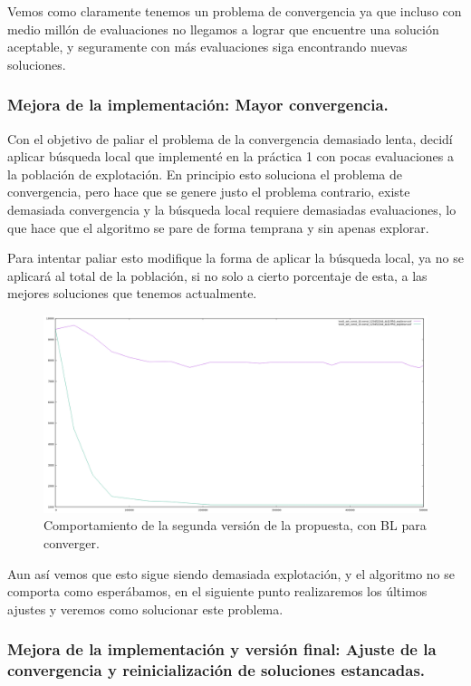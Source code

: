 \documentclass[12pt, spanish]{article}
\begin{document}
Vemos como claramente tenemos un problema de convergencia ya que incluso con medio millón de evaluaciones no llegamos a lograr que encuentre una solución aceptable, y seguramente con más evaluaciones siga encontrando nuevas soluciones.


\subsubsection{Mejora de la implementación: Mayor convergencia.}

Con el objetivo de paliar el problema de la convergencia demasiado lenta, decidí aplicar búsqueda local que implementé en la práctica 1 con pocas evaluaciones a la población de explotación. En principio esto soluciona el problema de convergencia, pero hace que se genere justo el problema contrario, existe demasiada convergencia y la búsqueda local requiere demasiadas evaluaciones, lo que hace que el algoritmo se pare de forma temprana y sin apenas explorar.

Para intentar paliar esto modifique la forma de aplicar la búsqueda local, ya no se aplicará al total de la población, si no solo a cierto porcentaje de esta, a las mejores soluciones que tenemos actualmente.


\begin{figure}[H]
	\centering
	\includegraphics[scale = 0.33]{con_BL_explotar.png}
	
	\caption{Comportamiento de la segunda versión de la propuesta, con BL para converger.}
	\label{fig:basico_BL}
\end{figure}

Aun así vemos que esto sigue siendo demasiada explotación, y el algoritmo no se comporta como esperábamos, en el siguiente punto realizaremos los últimos ajustes y veremos como solucionar este problema.


\subsubsection{Mejora de la implementación y versión final: Ajuste de la convergencia y reinicialización de soluciones estancadas.}
\end{document}
